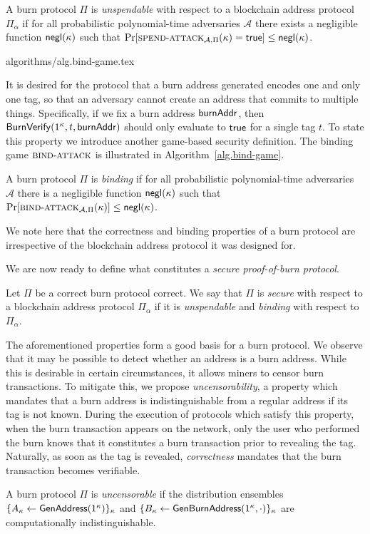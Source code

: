 \begin{definition}[Unspendability]
  A burn protocol $\Pi$ is \emph{unspendable} with respect to a blockchain address protocol $\Pi_\alpha$ if
  for all probabilistic polynomial-time adversaries $\mathcal{A}$ there exists a negligible function $\textsf{negl}(\kappa)$ such that
  $
    \Pr[\textsc{spend}\-\text{-}\-\textsc{attack}_{\mathcal{A}, \Pi}(\kappa) = \textsf{true}] \leq \textsf{negl}(\kappa)
  $.
\end{definition}

{algorithms/alg.bind-game.tex}

It is desired for the protocol that a burn address generated encodes one and only one tag, so that an adversary cannot create an address that commits to multiple things. Specifically, if we fix a burn address $\mathsf{burnAddr}$, then $\mathsf{BurnVerify}(1^\kappa, t, \mathsf{burnAddr})$ should only evaluate to $\mathsf{true}$ for a single tag $t$. To state this property we introduce another game-based security definition. The binding game $\textsc{bind}\-\text{-}\-\textsc{attack}$ is illustrated in Algorithm~\ref{alg.bind-game}.

\begin{definition}[Binding]
  A burn protocol $\Pi$ is \emph{binding} if
  for all probabilistic polynomial-time adversaries $\mathcal{A}$ there is a
  negligible function $\textsf{negl}(\kappa)$ such that
  $\Pr[\textsc{bind}\-\text{-}\-\textsc{attack}_{\mathcal{A},\Pi}(\kappa)] \leq \textsf{negl}(\kappa)$.
\end{definition}

We note here that the correctness and binding properties of a burn protocol are irrespective of the blockchain address protocol it was designed for.

We are now ready to define what constitutes a \emph{secure proof-of-burn protocol}.

\begin{definition}[Security]
  Let $\Pi$ be a correct burn protocol correct. We say that $\Pi$ is \emph{secure} with respect to a blockchain address protocol $\Pi_\alpha$ if it is \emph{unspendable} and \emph{binding} with respect to $\Pi_\alpha$.
\end{definition}

The aforementioned properties form a good basis for a burn protocol. We observe that it may be possible to detect whether an address is a burn address. While this is desirable in certain circumstances, it allows miners to censor burn transactions. To mitigate this, we propose \emph{uncensorability}, a property which mandates that a burn address is indistinguishable from a regular address if its tag is not known. During the execution of protocols which satisfy this property, when the burn transaction appears on the network, only the user who performed the burn knows that it constitutes a burn transaction prior to revealing the tag. Naturally, as soon as the tag is revealed, \emph{correctness} mandates that the burn transaction becomes verifiable.

\begin{definition}[Uncensorability]
  A burn protocol $\Pi$ is \emph{uncensorable} if
  the distribution ensembles $\{A_\kappa \gets \mathsf{GenAddress}(1^\kappa)\}_\kappa$ and
  $\{B_\kappa \gets \mathsf{Gen}\-\mathsf{Burn}\-\mathsf{Address}(1^\kappa, \cdot)\}_\kappa$ are computationally indistinguishable.
\end{definition}

